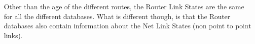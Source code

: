 


Other than the age of the different routes, the Router Link States are the same for all the different databases. What is different though, is that the Router databases also contain information about the Net Link States (non point to point links).